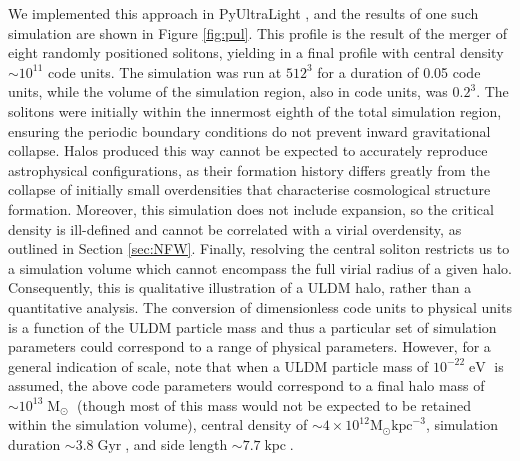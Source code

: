 \documentclass[a4paper,11pt]{article}
\begin{document}
We implemented this approach in {\sc PyUltraLight} \cite{Edwards:2018ccc}, and the results of one such simulation are shown in Figure \ref{fig:pul}. This profile is the result of the merger of eight randomly positioned solitons, yielding in a final profile with central density $\sim 10^{11}$ code units. The simulation was run at $512^3$ for a duration of 0.05 code units, while the volume of the simulation region, also in code units, was $0.2^3$.  The solitons were initially within the innermost eighth of the total simulation region, ensuring the periodic boundary conditions do not  prevent inward gravitational collapse. Halos produced this way cannot be expected to accurately reproduce astrophysical configurations, as their formation history differs greatly from the collapse of initially small overdensities that characterise cosmological structure formation. Moreover, this simulation does not include expansion, so the critical density is ill-defined and  cannot be correlated with a virial overdensity, as outlined in Section \ref{sec:NFW}. Finally, resolving the central soliton restricts us to a simulation volume which cannot encompass the full virial radius of a given halo. Consequently, this is qualitative illustration of a ULDM halo, rather than a quantitative analysis. The conversion of dimensionless code units to physical units is a function of the ULDM particle mass and thus a particular set of simulation parameters could correspond to a range of physical parameters. However, for a general indication of scale, note that when a ULDM particle mass of $10^{-22}\operatorname{eV}$ is assumed, the above code parameters would correspond to a final halo mass of $\sim 10^{13}\operatorname{M}_{\odot}$ (though most of this mass would not be expected to be retained within the simulation volume), central density of $\sim 4\times 10^{12} \mathrm{M}_{\odot}\mathrm{kpc}^{-3}$, simulation duration $\sim 3.8 \operatorname{Gyr}$, and side length $\sim 7.7 \operatorname{kpc}$.
\end{document}
